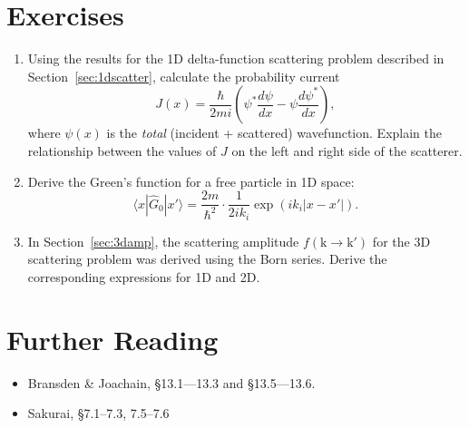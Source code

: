 \documentclass[pra,12pt]{revtex4}
\begin{document}
\section*{Exercises}

\begin{enumerate}
\item Using the results for the 1D delta-function scattering problem
  described in Section~\ref{sec:1dscatter}, calculate the probability
  current
  $$J(x) = \frac{\hbar}{2mi}\left(\psi^*\frac{d\psi}{dx} - \psi\frac{d\psi^*}{dx}\right),$$
  where $\psi(x)$ is the \textit{total} (incident + scattered)
  wavefunction.  Explain the relationship between the values of $J$ on
  the left and right side of the scatterer.

\item Derive the Green's function for a free particle in 1D space:
  $$\langle x|\hat{G}_0|x'\rangle = \frac{2m}{\hbar^2} \cdot \frac{1}{2ik_i} \exp\left(ik_i|x-x'|\right).$$

\item In Section~\ref{sec:3damp}, the scattering amplitude
  $f(\mathrm{k}\rightarrow\mathrm{k}')$ for the 3D scattering problem
  was derived using the Born series.  Derive the corresponding
  expressions for 1D and 2D.
\end{enumerate}


\section*{Further Reading}

\begin{itemize}
\item Bransden \& Joachain, \S13.1---13.3 and \S13.5---13.6.
\item Sakurai, \S7.1--7.3, 7.5--7.6

\end{itemize}
\end{document}
